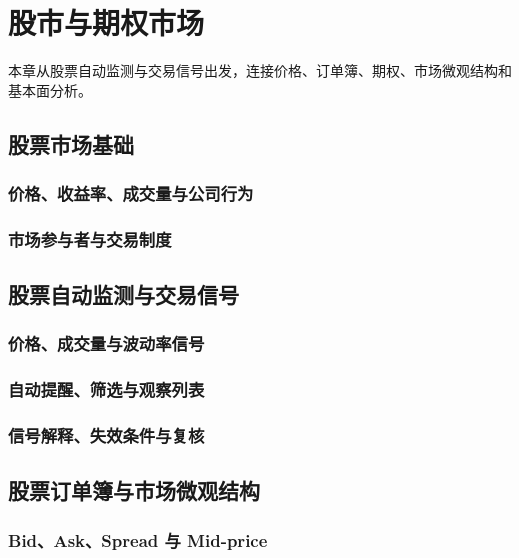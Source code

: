 \chapter{股市与期权市场}

本章从股票自动监测与交易信号出发，连接价格、订单簿、期权、市场微观结构和基本面分析。


\section{股票市场基础}

\subsection{价格、收益率、成交量与公司行为}

\subsection{市场参与者与交易制度}


\section{股票自动监测与交易信号}

\subsection{价格、成交量与波动率信号}

\subsection{自动提醒、筛选与观察列表}

\subsection{信号解释、失效条件与复核}


\section{股票订单簿与市场微观结构}

\subsection{Bid、Ask、Spread 与 Mid-price}

